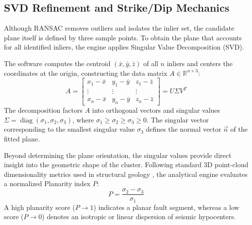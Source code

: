 \subsection{SVD Refinement and Strike/Dip Mechanics}

Although RANSAC removes outliers and isolates the inlier set, the candidate plane itself is defined by three sample points. To obtain the plane that accounts for all identified inliers, the engine applies Singular Value Decomposition (SVD).

The software computes the centroid $(\bar{x}, \bar{y}, \bar{z})$ of all $n$ inliers and centers the coordinates at the origin, constructing the data matrix $A \in \mathbb{R}^{n \times 3}$:
\begin{equation}
    A = \begin{bmatrix}
        x_1 - \bar{x} & y_1 - \bar{y} & z_1 - \bar{z} \\
        \vdots & \vdots & \vdots \\
        x_n - \bar{x} & y_n - \bar{y} & z_n - \bar{z}
    \end{bmatrix}
    = U \Sigma V^T
    \label{eq:svd}
\end{equation}
The decomposition factors $A$ into orthogonal vectors and singular values $\Sigma = \operatorname{diag}(\sigma_1, \sigma_2, \sigma_3)$, where $\sigma_1 \ge \sigma_2 \ge \sigma_3 \ge 0$. The singular vector corresponding to the smallest singular value $\sigma_3$ defines the normal vector $\vec{n}$ of the fitted plane.

Beyond determining the plane orientation, the singular values provide direct insight into the geometric shape of the cluster. Following standard 3D point-cloud dimensionality metrics used in structural geology \cite{fernandez2005plane}, the analytical engine evaluates a normalized Planarity index $P$:
\begin{equation}
    P = \frac{\sigma_2 - \sigma_3}{\sigma_1}
    \label{eq:planarity}
\end{equation}
A high planarity score ($P \to 1$) indicates a planar fault segment, whereas a low score ($P \to 0$) denotes an isotropic or linear dispersion of seismic hypocenters.

